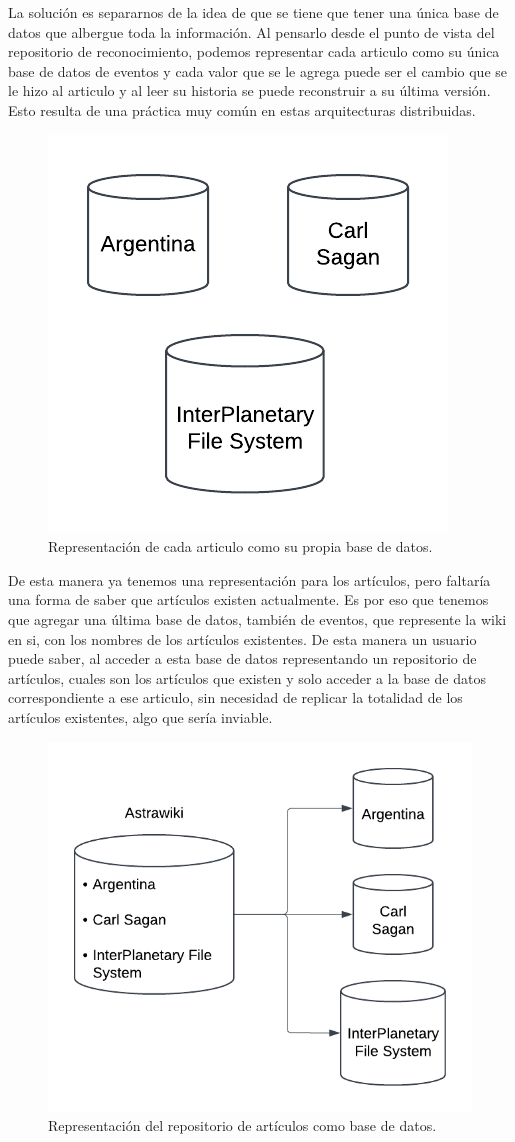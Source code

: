 La solución es separarnos de la idea de que se tiene que tener una única base de datos que albergue toda la información. Al pensarlo desde el punto de vista del repositorio de reconocimiento, podemos representar cada articulo como su única base de datos de eventos y cada valor que se le agrega puede ser el cambio que se le hizo al articulo y al leer su historia se puede reconstruir a su última versión. Esto resulta de una práctica muy común en estas arquitecturas distribuidas.

\begin{figure}[H]
    \centering
    \includegraphics[width=0.4\linewidth]{img/solucion-ipfs/bdd-articulos.png}
    \caption{Representación de cada articulo como su propia base de datos.}
    \label{fig:bdd-articulos}
\end{figure}

De esta manera ya tenemos una representación para los artículos, pero faltaría una forma de saber que artículos existen actualmente. Es por eso que tenemos que agregar una última base de datos, también de eventos, que represente la wiki en si, con los nombres de los artículos existentes. De esta manera un usuario puede saber, al acceder a esta base de datos representando un repositorio de artículos, cuales son los artículos que existen y solo acceder a la base de datos correspondiente a ese articulo, sin necesidad de replicar la totalidad de los artículos existentes, algo que sería inviable.

\begin{figure}[H]
    \centering
    \includegraphics[width=0.6\linewidth]{img/solucion-ipfs/bdd-wiki.png}
    \caption{Representación del repositorio de artículos como base de datos.}
    \label{fig:bdd-wiki}
\end{figure}

